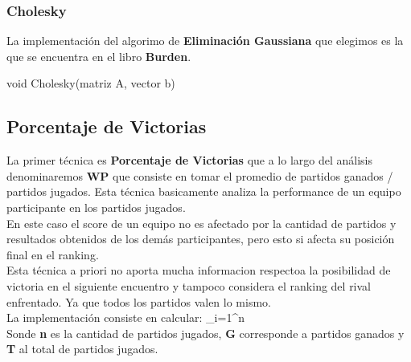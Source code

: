 \subsubsection{Cholesky}

La implementación del algorimo de \textbf{Eliminación Gaussiana} que elegimos es la que se encuentra en el libro \textbf{Burden}. \\


\begin{algorithm}
\begin{algorithmic}[1]\parskip=1mm
\caption{void Cholesky(matriz A, vector b)}
\end{algorithmic}
\end{algorithm}


\subsection{Porcentaje de Victorias}

La primer técnica es \textbf{Porcentaje de Victorias} que a lo largo del análisis denominaremos \textbf{WP} que consiste en tomar el promedio de partidos ganados / partidos jugados. Esta técnica basicamente analiza la performance de un equipo participante en los partidos jugados. \\

En este caso el score de un equipo no es afectado por la cantidad de partidos y resultados obtenidos de los demás participantes, pero esto si afecta su posición final en el ranking. \\

Esta técnica a priori no aporta mucha informacion respectoa la posibilidad de victoria en el siguiente encuentro y tampoco considera el ranking del rival enfrentado. Ya que todos los partidos valen lo mismo. \\

La implementación consiste en calcular: \sum_{i=1}^n{}  \\

Sonde \textbf{n} es la cantidad de partidos jugados, \textbf{G} corresponde a partidos ganados y \textbf{T} al total de partidos jugados. \\
